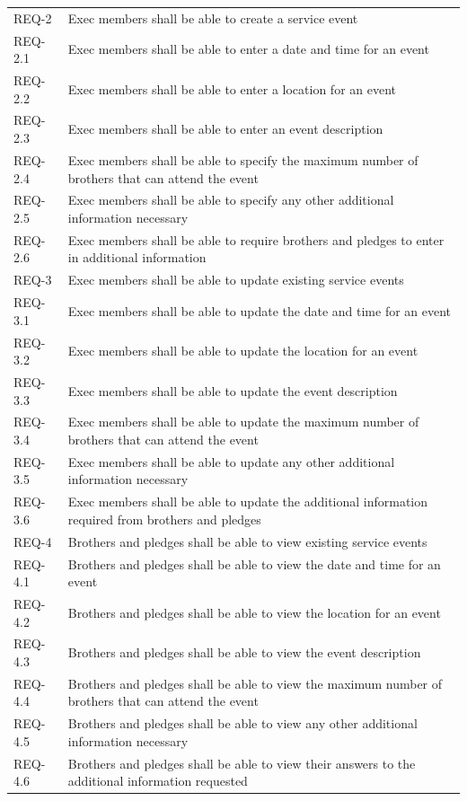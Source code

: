 \documentclass{article}
\newcommand{\req}[1]{REQ-{#1}}
\begin{document}
\begin{tabular}{lp{8cm}}
\req{2} & Exec members shall be able to create a service event \\
\req{2.1} & Exec members shall be able to enter a date and time for an
event\\
\req{2.2} & Exec members shall be able to enter a location for an
event\\
\req{2.3} & Exec members shall be able to enter an event description
\\
\req{2.4} & Exec members shall be able to specify the maximum number
of brothers that can attend the event\\
\req{2.5} & Exec members shall be able to specify any other additional
information necessary \\
\req{2.6} & Exec members shall be able to require brothers and pledges
to enter in
additional information\\
\req{3} & Exec members shall be able to update existing service events
\\
\req{3.1} & Exec members shall be able to update the date and time for an
event\\
\req{3.2} & Exec members shall be able to update the location for an
event\\
\req{3.3} & Exec members shall be able to update the event description
\\
\req{3.4} & Exec members shall be able to update the maximum number
of brothers that can attend the event\\
\req{3.5} & Exec members shall be able to update any other additional
information necessary \\
\req{3.6} & Exec members shall be able to update the additional
information required from brothers and pledges\\
\req{4} & Brothers and pledges shall be able to view existing service
events \\
\req{4.1} & Brothers and pledges shall be able to view the date and time for an
event\\
\req{4.2} & Brothers and pledges shall be able to view the location for an
event\\
\req{4.3} & Brothers and pledges shall be able to view the event description
\\
\req{4.4} & Brothers and pledges shall be able to view the maximum number
of brothers that can attend the event\\
\req{4.5} & Brothers and pledges shall be able to view any other additional
information necessary \\
\req{4.6} & Brothers and pledges shall be able to view their answers
to the additional information requested\\
\end{tabular}
\end{document}
